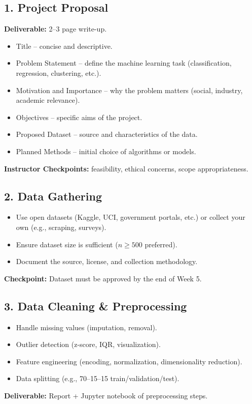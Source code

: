 \documentclass[a4paper,10pt]{article}
\begin{document}
\subsection*{1. Project Proposal}
\textbf{Deliverable:} 2--3 page write-up.
\begin{itemize}
    \item Title -- concise and descriptive.
    \item Problem Statement -- define the machine learning task (classification, regression, clustering, etc.).
    \item Motivation and Importance -- why the problem matters (social, industry, academic relevance).
    \item Objectives -- specific aims of the project.
    \item Proposed Dataset -- source and characteristics of the data.
    \item Planned Methods -- initial choice of algorithms or models.
\end{itemize}
\textbf{Instructor Checkpoints:} feasibility, ethical concerns, scope appropriateness.

\subsection*{2. Data Gathering}
\begin{itemize}
    \item Use open datasets (Kaggle, UCI, government portals, etc.) or collect your own (e.g., scraping, surveys).
    \item Ensure dataset size is sufficient ($n \geq 500$ preferred).
    \item Document the source, license, and collection methodology.
\end{itemize}
\textbf{Checkpoint:} Dataset must be approved by the end of Week 5.

\subsection*{3. Data Cleaning \& Preprocessing}
\begin{itemize}
    \item Handle missing values (imputation, removal).
    \item Outlier detection (z-score, IQR, visualization).
    \item Feature engineering (encoding, normalization, dimensionality reduction).
    \item Data splitting (e.g., 70--15--15 train/validation/test).
\end{itemize}
\textbf{Deliverable:} Report + Jupyter notebook of preprocessing steps.
\end{document}
